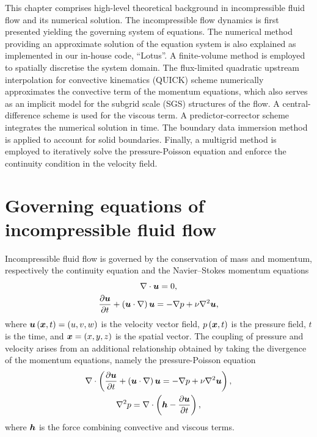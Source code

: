 \documentclass[../main.tex]{subfiles}
\begin{document}
\vspace{0.25cm}
This chapter comprises high-level theoretical background in incompressible fluid flow and its numerical solution.
The incompressible flow dynamics is first presented yielding the governing system of equations.
The numerical method providing an approximate solution of the equation system is also explained as implemented in our in-house code, ``Lotus''.
A finite-volume method is employed to spatially discretise the system domain.
The flux-limited quadratic upstream interpolation for convective kinematics (QUICK) scheme numerically approximates the convective term of the momentum equations, which also serves as an implicit model for the subgrid scale (SGS) structures of the flow.
A central-difference scheme is used for the viscous term.
A predictor-corrector scheme integrates the numerical solution in time.
The boundary data immersion method is applied to account for solid boundaries.
Finally, a multigrid method is employed to iteratively solve the pressure-Poisson equation and enforce the continuity condition in the velocity field.

\section{Governing equations of incompressible fluid flow}

Incompressible fluid flow is governed by the conservation of mass and momentum, respectively the continuity equation and the Navier--Stokes momentum equations
\begin{gather}
\nabla\cdot\boldsymbol{u}=0,\label{eq:div_u}\\
\frac{\partial \boldsymbol{u}}{\partial t}+\left(\boldsymbol{u}\cdot\nabla \right)\boldsymbol{u}=-\nabla p+\nu\nabla^2\boldsymbol{u},\label{eq:n-s}
\end{gather}
where $\boldsymbol{u}\left(\boldsymbol{x}, t\right) = \left(u, v, w\right)$ is the velocity vector field, $p\left(\boldsymbol{x}, t\right)$ is the pressure field, $t$ is the time, and $\boldsymbol{x}=\left(x,y,z\right)$ is the spatial vector.
The coupling of pressure and velocity arises from an additional relationship obtained by taking the divergence of the momentum equations, namely the pressure-Poisson equation
\begin{gather}
\nabla\cdot\left(\frac{\partial \boldsymbol{u}}{\partial t}+\left(\boldsymbol{u}\cdot\nabla \right)\boldsymbol{u}=-\nabla p+\nu\nabla^2\boldsymbol{u} \right),\\
\nabla^2 p = \nabla\cdot\left(\boldsymbol{h}-\frac{\partial \boldsymbol{u}}{\partial t} \right),\label{eq:ppe}
\end{gather}
where $\boldsymbol{h}$ is the force combining convective and viscous terms.
\end{document}
